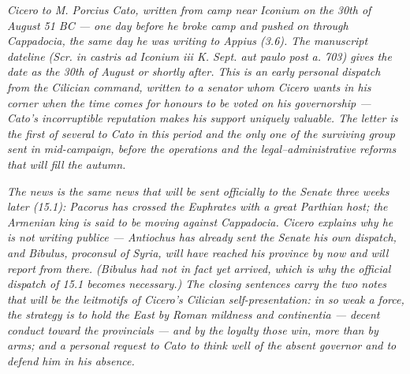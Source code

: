 
\textit{Cicero to M. Porcius Cato, written from camp
near Iconium on the 30th of August 51 BC --- one day
before he broke camp and pushed on through Cappadocia,
the same day he was writing to Appius (3.6). The
manuscript dateline (\textit{Scr. in castris ad
Iconium iii K. Sept. aut paulo post a. 703}) gives the
date as the 30th of August or shortly after. This is
an early personal dispatch from the Cilician command,
written to a senator whom Cicero wants in his corner
when the time comes for honours to be voted on his
governorship --- Cato's incorruptible reputation makes
his support uniquely valuable. The letter is the first
of several to Cato in this period and the only one of
the surviving group sent in mid-campaign, before the
operations and the legal--administrative reforms that
will fill the autumn.}

\textit{The news is the same news that will be sent
officially to the Senate three weeks later (15.1):
Pacorus has crossed the Euphrates with a great Parthian
host; the Armenian king is said to be moving against
Cappadocia. Cicero explains why he is not writing
\textit{publice} --- Antiochus has already sent the
Senate his own dispatch, and Bibulus, proconsul of
Syria, will have reached his province by now and will
report from there. (Bibulus had not in fact yet
arrived, which is why the official dispatch of 15.1
becomes necessary.) The closing sentences carry the
two notes that will be the leitmotifs of Cicero's
Cilician self-presentation: in so weak a force, the
strategy is to hold the East by Roman mildness and
\textit{continentia} --- decent conduct toward the
provincials --- and by the loyalty those win, more
than by arms; and a personal request to Cato to think
well of the absent governor and to defend him in his
absence.}
